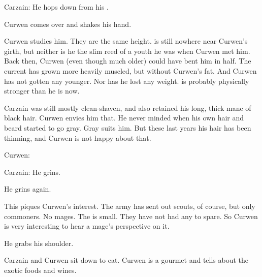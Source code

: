 Carzain:
He hops down from his \relc. 

Curwen comes over and shakes his hand. 




Curwen studies him. 
They are the same height. 
\Shireyo is still nowhere near Curwen's girth, but neither is he the slim reed of a youth he was when Curwen met him. 
Back then, Curwen (even though much older) could have bent him in half. 
The current \Shireyo has grown more heavily muscled, but without Curwen's fat. 
And Curwen has not gotten any younger. 
Nor has he lost any weight. 
\Shireyo is probably physically stronger than he is now. 

Carzain was still mostly clean-shaven, and also retained his long, thick mane of black hair. 
Curwen envies him that. 
He never minded when his own hair and beard started to go gray. 
Gray suits him.
But these last years his hair has been thinning, and Curwen is not happy about that. 

Curwen:

Carzain:
He grins.


He grins again.

This piques Curwen's interest. 
The army has sent out scouts, of course, but only commoners.
No mages. 
The \ishrah is small.
They have not had any to spare.
So Curwen is very interesting to hear a mage's perspective on it. 

He grabs his shoulder.





\begin{comment}
  \subsection{Carzain tells Curwen news}
\end{comment}
\new
Carzain and Curwen sit down to eat. 
Curwen is a gourmet and tells about the exotic foods and wines.

